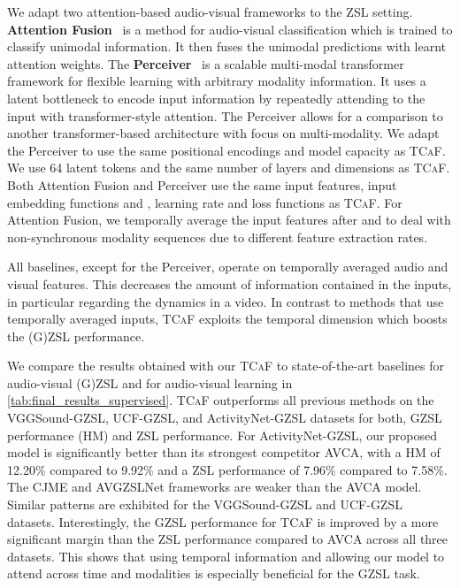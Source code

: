 \documentclass[runningheads]{llncs}
\newcommand{\mypara}[1]{\noindent{\bf{#1}}}
\newcommand{\modelName}{\textsc{TCaF}\xspace}
\newcommand{\activity}{{ActivityNet-GZSL}\xspace}
\newcommand{\ucf}{{UCF-GZSL}\xspace}
\newcommand{\vgg}{{VGGSound-GZSL}\xspace}
\begin{document}
\mypara{Audio-visual baselines adapted to ZSL.} We adapt two attention-based audio-visual frameworks to the ZSL setting. \textbf{Attention Fusion}~\cite{fayek2020large} is a method for audio-visual classification which is trained to classify unimodal information. It then fuses the unimodal predictions with learnt attention weights. 
The \textbf{Perceiver}~\cite{jaegle2021perceiver} is a scalable multi-modal transformer framework for flexible learning with arbitrary modality information. It uses a latent bottleneck to encode input information by repeatedly attending to the input with transformer-style attention. The Perceiver allows for a comparison to another transformer-based architecture with focus on multi-modality. We adapt the Perceiver to use the same positional encodings and model capacity as \modelName. We use 64 latent tokens and the same number of layers and dimensions as \modelName. Both Attention Fusion and Perceiver use the same input features, input embedding functions  and , learning rate and loss functions as \modelName. For Attention Fusion, we temporally average the input features after  and  to deal with non-synchronous modality sequences due to different feature extraction rates.

All baselines, except for the Perceiver, operate on temporally averaged audio and visual features.
This decreases the amount of information contained in the inputs, in particular regarding the dynamics in a video. In contrast to methods that use temporally averaged inputs, \modelName exploits the temporal dimension which boosts the (G)ZSL performance.

\mypara{Results.}
We compare the results obtained with our \modelName to state-of-the-art baselines for audio-visual (G)ZSL and for audio-visual learning in \cref{tab:final_results_supervised}.
\modelName outperforms all previous methods on the \vgg, \ucf, and \activity datasets for both, GZSL performance (HM) and ZSL performance.
For \activity, our proposed model is significantly better than its strongest competitor AVCA, with a HM of 12.20\% compared to 9.92\% and a ZSL performance of 7.96\% compared to 7.58\%. The CJME and AVGZSLNet frameworks are weaker than the AVCA model.
Similar patterns are exhibited for the \vgg and \ucf datasets.
Interestingly, the GZSL performance for \modelName{} is improved by a more significant margin than the ZSL performance compared to AVCA across all three datasets. This shows that using temporal information and allowing our model to attend across time and modalities is especially beneficial for the GZSL task. 
\end{document}
